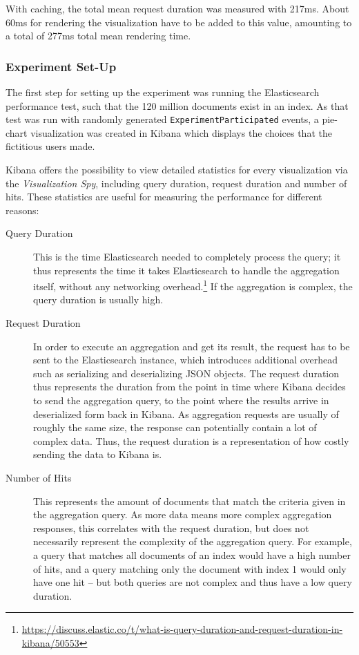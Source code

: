 With caching, the total mean request duration was measured with 217ms.
About 60ms for rendering the visualization have to be added to this value, amounting to a total of 277ms total mean rendering time.

\subsubsection{Experiment Set-Up}

The first step for setting up the experiment was running the Elasticsearch performance test, such that the 120 million documents exist in an index.
As that test was run with randomly generated \texttt{ExperimentParticipated} events, a pie-chart visualization was created in Kibana which displays the choices that the fictitious users made.

Kibana offers the possibility to view detailed statistics for every visualization via the \emph{Visualization Spy}, including query duration, request duration and number of hits.
These statistics are useful for measuring the performance for different reasons:

\begin{description}
\item[Query Duration] This is the time Elasticsearch needed to completely process the query; it thus represents the time it takes Elasticsearch to handle the aggregation itself, without any networking overhead.\footnote{\url{https://discuss.elastic.co/t/what-is-query-duration-and-request-duration-in-kibana/50553}}
If the aggregation is complex, the query duration is usually high.
\item[Request Duration] In order to execute an aggregation and get its result, the request has to be sent to the Elasticsearch instance, which introduces additional overhead such as serializing and deserializing \ac{JSON} objects.
The request duration thus represents the duration from the point in time where Kibana decides to send the aggregation query, to the point where the results arrive in deserialized form back in Kibana.
As aggregation requests are usually of roughly the same size, the response can potentially contain a lot of complex data.
Thus, the request duration is a representation of how costly sending the data to Kibana is.
\item[Number of Hits] This represents the amount of documents that match the criteria given in the aggregation query.
As more data means more complex aggregation responses, this correlates with the request duration, but does not necessarily represent the complexity of the aggregation query.
For example, a query that matches all documents of an index would have a high number of hits, and a query matching only the document with index 1 would only have one hit -- but both queries are not complex and thus have a low query duration.
\end{description}

